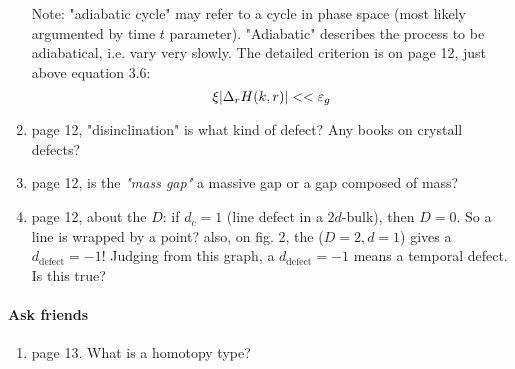 \documentclass{article}
\begin{document}
\begin{enumerate}
        Note: "adiabatic cycle" may refer to a cycle in phase space
        (most likely argumented by time $t$ parameter). "Adiabatic"
        describes the process to be adiabatical, i.e. vary very
        slowly. The detailed criterion is on page 12, just above
        equation 3.6:
        \begin{equation}
            \xi \abs{\Delta_r H(k,r)}<<\varepsilon_g
        \end{equation}
    \item page 12, "disinclination" is what kind of defect? Any books
        on crystall defects?
    \item page 12, is the \textit{"mass gap"} a massive gap or a gap
        composed of mass?
    \item page 12, about the $D$: if $d_c=1$ (line defect in a
        $2d$-bulk), then $D=0$. So a line is wrapped by a point?
        also, on fig. 2, the ($D=2,d=1$) gives a $d_\text{defect}=-1$!
        Judging from this graph, a $d_\text{defect}=-1$ means a
        temporal defect. Is this true?
\end{enumerate}

\paragraph{Ask friends}
\begin{enumerate}
    \item page 13. What is a homotopy type?
\end{enumerate}
\end{document}
